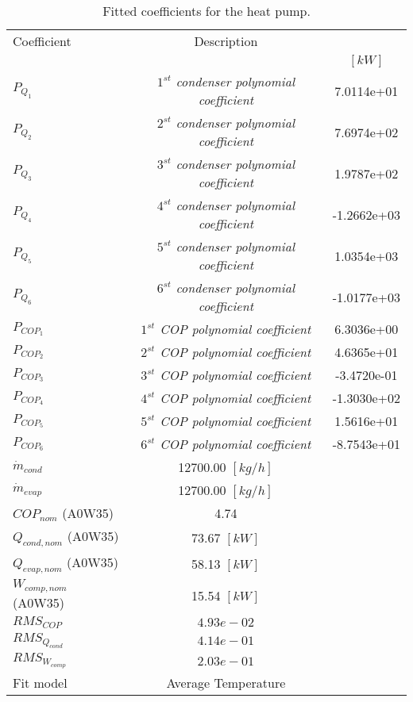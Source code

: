 \documentclass[english]{SPFShortReport}
\author{Dani Carbonell}
\begin{document}
\begin{table}[!ht]
\begin{small}
\caption{Fitted coefficients for the heat pump.}
\begin{center}
\resizebox{12cm}{!} 
{
\begin{tabular}{l | c c } 
\hline
\hline
Coefficient &Description & \\ 
 & &$[kW]$\\ 
\hline
$P_{Q_{1}}$ & \emph{$1^{st}$ condenser polynomial coefficient}  & 7.0114e+01    \\ 
$P_{Q_{2}}$ & \emph{$2^{st}$ condenser polynomial coefficient}  & 7.6974e+02    \\ 
$P_{Q_{3}}$ & \emph{$3^{st}$ condenser polynomial coefficient}  & 1.9787e+02    \\ 
$P_{Q_{4}}$ & \emph{$4^{st}$ condenser polynomial coefficient}  & -1.2662e+03    \\ 
$P_{Q_{5}}$ & \emph{$5^{st}$ condenser polynomial coefficient}  & 1.0354e+03    \\ 
$P_{Q_{6}}$ & \emph{$6^{st}$ condenser polynomial coefficient}  & -1.0177e+03    \\ 
\hline
$P_{COP_{1}}$ & \emph{$1^{st}$ COP polynomial coefficient}  & 6.3036e+00    \\ 
$P_{COP_{2}}$ & \emph{$2^{st}$ COP polynomial coefficient}  & 4.6365e+01    \\ 
$P_{COP_{3}}$ & \emph{$3^{st}$ COP polynomial coefficient}  & -3.4720e-01    \\ 
$P_{COP_{4}}$ & \emph{$4^{st}$ COP polynomial coefficient}  & -1.3030e+02    \\ 
$P_{COP_{5}}$ & \emph{$5^{st}$ COP polynomial coefficient}  & 1.5616e+01    \\ 
$P_{COP_{6}}$ & \emph{$6^{st}$ COP polynomial coefficient}  & -8.7543e+01    \\ 
\hline
$\dot m_{cond}$ & 12700.00 $[kg/h]$ \\ 
$\dot m_{evap}$ & 12700.00 $[kg/h]$ \\ 
\hline
$COP_{nom}$ (A0W35)& 4.74 \\ 
$Q_{cond,nom}$ (A0W35)& 73.67 $[kW]$\\ 
$Q_{evap,nom}$ (A0W35)& 58.13 $[kW]$\\ 
$W_{comp,nom}$ (A0W35)& 15.54 $[kW]$\\ 
\hline
 $RMS_{COP}$ & $4.93e-02$ \\ 
 $RMS_{Q_{cond}}$ & $4.14e-01$ \\ 
 $RMS_{W_{comp}}$ & $2.03e-01$ \\ 
\hline
Fit model & Average Temperature\\ 
\hline
\hline
\end{tabular}
}
\label{CoefTable}
\end{center}
\end{small}
\end{table}
\end{document}
